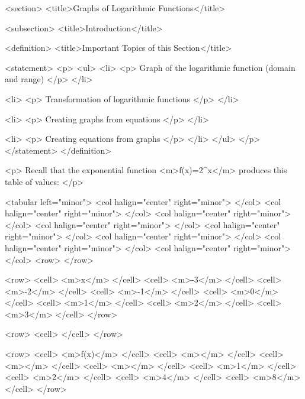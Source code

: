 <section>
    <title>Graphs of Logarithmic Functions</title>

    <subsection>
        <title>Introduction</title>

        <definition>
            <title>Important Topics of this Section</title>

            <statement>
                <p>
                    <ul>
                        <li>
                            <p>
                                Graph of the logarithmic function (domain and range)
                            </p>
                        </li>

                        <li>
                            <p>
                                Transformation of logarithmic functions
                            </p>
                        </li>

                        <li>
                            <p>
                                Creating graphs from equations
                            </p>
                        </li>

                        <li>
                            <p>
                                Creating equations from graphs
                            </p>
                        </li>
                    </ul>
                </p>
            </statement>
        </definition>

        <p>
            Recall that the exponential function <m>f(x)=2^{x}</m> produces this table of values:
        </p>

        <tabular left="minor">
            <col halign="center" right="minor"> </col> <col halign="center" right="minor"> </col> <col halign="center" right="minor"> </col> <col halign="center" right="minor"> </col> <col halign="center" right="minor"> </col> <col halign="center" right="minor"> </col> <col halign="center" right="minor"> </col> <col halign="center" right="minor"> </col>
            <row>
            </row>

            <row>
                <cell> <m>x</m> </cell>
                <cell> <m>-3</m> </cell>
                <cell> <m>-2</m> </cell>
                <cell> <m>-1</m> </cell>
                <cell> <m>0</m> </cell>
                <cell> <m>1</m> </cell>
                <cell> <m>2</m> </cell>
                <cell> <m>3</m> </cell>
            </row>

            <row>
                <cell> </cell>
            </row>

            <row>
                <cell> <m>f(x)</m> </cell>
                <cell> <m></m> </cell>
                <cell> <m></m> </cell>
                <cell> <m></m> </cell>
                <cell> <m>1</m> </cell>
                <cell> <m>2</m> </cell>
                <cell> <m>4</m> </cell>
                <cell> <m>8</m> </cell>
            </row>


